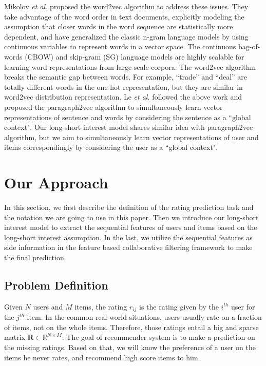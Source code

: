 \documentclass{llncs}
\begin{document}
Mikolov \textit{et al.} \cite{mikolov2013efficient, mikolov2013distributed} proposed
the word2vec algorithm to address these issues. They take advantage of the word order
in text documents, explicitly modeling the assumption that closer words in the word
sequence are statistically more dependent, and have generalized the classic n-gram
language models by using continuous variables to represent words in a vector space.
The continuous bag-of-words (CBOW) and skip-gram (SG) language models are highly
scalable for learning word representations from large-scale corpora.
The word2vec algorithm breaks the semantic gap between words.
For example, ``trade'' and ``deal'' are totally different words in the one-hot representation,
but they are similar in word2vec distribution representation.
Le \textit{et al.} \cite{le2014distributed} followed the above work and proposed
the paragraph2vec algorithm to simultaneously learn vector representations of sentence
and words by considering the sentence as a ``global context".
Our long-short interest model shares similar idea with paragraph2vec algorithm,
but we aim to simultaneously learn vector representations of user and items
correspondingly by considering the user as a ``global context".

\section{Our Approach}
In this section,
we first describe the definition of the rating prediction task and
the notation we are going to use in this paper.
Then we introduce our long-short interest model to extract the sequential features
of users and items based on the long-short interest assumption.
In the last, we utilize the sequential features as side information
in the feature based collaborative filtering framework to make the final prediction.

\subsection{Problem Definition}
Given $N$ users and $M$ items, the rating $r_{ij}$ is the rating given by
the $i^{th}$ user for the $j^{th}$ item.
In the common real-world situations,
users usually rate on a fraction of items, not on the whole items.
Therefore,
those ratings entail a big and sparse matrix $\mathbf{R} \in \mathbb{R}^{N \times M}$.
The goal of recommender system is to make a prediction on the missing ratings.
Based on that, we will know the preference of a user on the items he never rates,
and recommend high score items to him.
\end{document}
